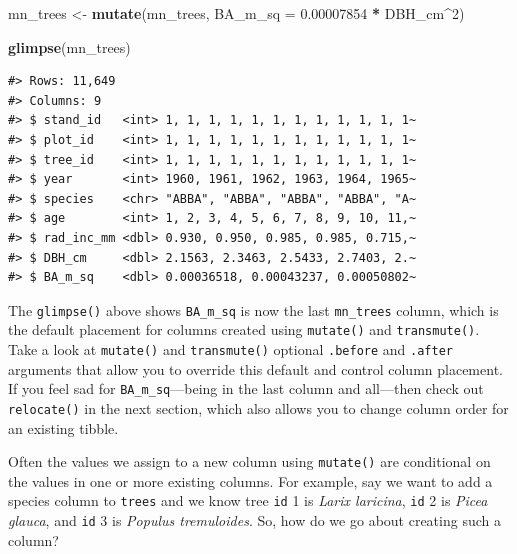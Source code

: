 \documentclass[
  11pt,
]{krantz}
\newenvironment{Shaded}{\begin{snugshade}}{\end{snugshade}}
\newcommand{\DataTypeTok}[1]{\textcolor[rgb]{0.13,0.29,0.53}{#1}}
\newcommand{\DecValTok}[1]{\textcolor[rgb]{0.00,0.00,0.81}{#1}}
\newcommand{\FloatTok}[1]{\textcolor[rgb]{0.00,0.00,0.81}{#1}}
\newcommand{\KeywordTok}[1]{\textcolor[rgb]{0.13,0.29,0.53}{\textbf{#1}}}
\newcommand{\NormalTok}[1]{#1}
\newcommand{\OperatorTok}[1]{\textcolor[rgb]{0.81,0.36,0.00}{\textbf{#1}}}
\newcommand{\StringTok}[1]{\textcolor[rgb]{0.31,0.60,0.02}{#1}}
\theoremstyle{definition}
\theoremstyle{definition}
\theoremstyle{definition}
\theoremstyle{definition}
\theoremstyle{remark}
\begin{document}
\begin{Shaded}
\begin{Highlighting}[]
\NormalTok{mn\_trees \textless{}{-}}\StringTok{ }\KeywordTok{mutate}\NormalTok{(mn\_trees, }\DataTypeTok{BA\_m\_sq =} \FloatTok{0.00007854} \OperatorTok{*}\StringTok{ }\NormalTok{DBH\_cm}\OperatorTok{\^{}}\DecValTok{2}\NormalTok{)}

\KeywordTok{glimpse}\NormalTok{(mn\_trees)}
\end{Highlighting}
\end{Shaded}

\begin{verbatim}
#> Rows: 11,649
#> Columns: 9
#> $ stand_id   <int> 1, 1, 1, 1, 1, 1, 1, 1, 1, 1, 1, 1~
#> $ plot_id    <int> 1, 1, 1, 1, 1, 1, 1, 1, 1, 1, 1, 1~
#> $ tree_id    <int> 1, 1, 1, 1, 1, 1, 1, 1, 1, 1, 1, 1~
#> $ year       <int> 1960, 1961, 1962, 1963, 1964, 1965~
#> $ species    <chr> "ABBA", "ABBA", "ABBA", "ABBA", "A~
#> $ age        <int> 1, 2, 3, 4, 5, 6, 7, 8, 9, 10, 11,~
#> $ rad_inc_mm <dbl> 0.930, 0.950, 0.985, 0.985, 0.715,~
#> $ DBH_cm     <dbl> 2.1563, 2.3463, 2.5433, 2.7403, 2.~
#> $ BA_m_sq    <dbl> 0.00036518, 0.00043237, 0.00050802~
\end{verbatim}

The \texttt{glimpse()} above shows \texttt{BA\_m\_sq} is now the last \texttt{mn\_trees} column, which is the default placement for columns created using \texttt{mutate()} and \texttt{transmute()}. Take a look at \texttt{mutate()} and \texttt{transmute()} optional \texttt{.before} and \texttt{.after} arguments that allow you to override this default and control column placement. If you feel sad for \texttt{BA\_m\_sq}---being in the last column and all---then check out \texttt{relocate()} in the next section, which also allows you to change column order for an existing tibble.

Often the values we assign to a new column using \texttt{mutate()} are conditional on the values in one or more existing columns. For example, say we want to add a species column to \texttt{trees} and we know tree \texttt{id} 1 is \emph{Larix laricina}, \texttt{id} 2 is \emph{Picea glauca}, and \texttt{id} 3 is \emph{Populus tremuloides}. So, how do we go about creating such a column?
\end{document}
